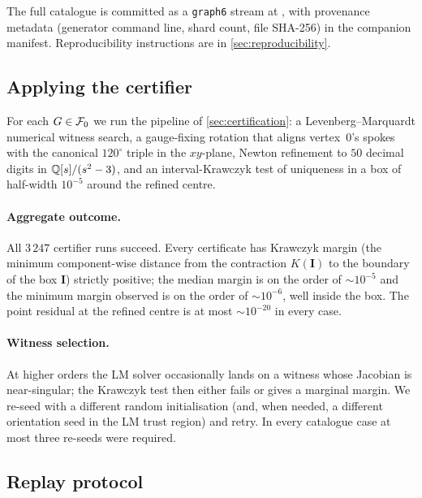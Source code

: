 The full catalogue is committed as a \texttt{graph6} stream at
, with provenance
metadata (generator command line, shard count, file SHA-256) in the
companion manifest. Reproducibility instructions are in
\cref{sec:reproducibility}.

\subsection{Applying the certifier}
\label{sec:finite-theorem-certifier}

For each $G \in \mathcal{F}_0$ we run the pipeline of
\cref{sec:certification}: a Levenberg--Marquardt numerical witness
search, a gauge-fixing rotation that aligns vertex~$0$'s spokes with
the canonical $120^{\circ}$ triple in the $xy$-plane, Newton
refinement to $50$ decimal digits in $\mathbb{Q}[s]/(s^{2}-3)$, and an
interval-Krawczyk test of uniqueness in a box of half-width
$10^{-5}$ around the refined centre.


\paragraph{Aggregate outcome.}
All $3\,247$ certifier runs succeed. Every certificate has Krawczyk
margin (the minimum component-wise distance from the contraction
$K(\mathbf{I})$ to the boundary of the box $\mathbf{I}$) strictly
positive; the median margin is on the order of
$\sim 10^{-5}$ and the minimum margin observed is on the order of
$\sim 10^{-6}$, well inside the box. The point residual at the
refined centre is at most $\sim 10^{-20}$ in every case.

\paragraph{Witness selection.}
At higher orders the LM solver occasionally lands on a witness whose
Jacobian is near-singular; the Krawczyk test then either fails or
gives a marginal margin. We re-seed with a different random
initialisation (and, when needed, a different orientation seed in the
LM trust region) and retry. In every catalogue case at most three
re-seeds were required.

\subsection{Replay protocol}
\label{sec:finite-theorem-replay}

